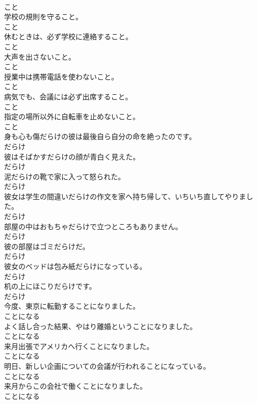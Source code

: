 \documentclass[8pt]{extreport}
\begin{document}
\begin{CJK}{UTF8}{min}
\\	こと
\\	学校の規則を守ること。	
\\	こと
\\	休むときは、必ず学校に連絡すること。	
\\	こと
\\	大声を出さないこと。	
\\	こと
\\	授業中は携帯電話を使わないこと。	
\\	こと
\\	病気でも、会議には必ず出席すること。	
\\	こと
\\	指定の場所以外に自転車を止めないこと。	
\\	こと
\\	身も心も傷だらけの彼は最後自ら自分の命を絶ったのです。	
\\	だらけ
\\	彼はそばかすだらけの顔が青白く見えた。	
\\	だらけ
\\	泥だらけの靴で家に入って怒られた。	
\\	だらけ
\\	彼女は学生の間違いだらけの作文を家へ持ち帰して、いちいち直してやりました。	
\\	だらけ
\\	部屋の中はおもちゃだらけで立つところもありません。	
\\	だらけ
\\	彼の部屋はゴミだらけだ。	
\\	だらけ
\\	彼女のベッドは包み紙だらけになっている。	
\\	だらけ
\\	机の上にほこりだらけです。	
\\	だらけ
\\	今度、東京に転勤することになりました。	
\\	ことになる
\\	よく話し合った結果、やはり離婚ということになりました。	
\\	ことになる
\\	来月出張でアメリカへ行くことになりました。	
\\	ことになる
\\	明日、新しい企画についての会議が行われることになっている。	
\\	ことになる
\\	来月からこの会社で働くことになりました。	
\\	ことになる

\end{CJK}
\end{document}

